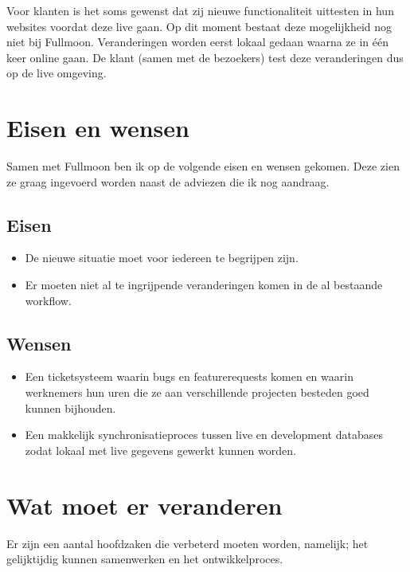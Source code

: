 \documentclass[12pt,a4paper]{article}
\begin{document}
  Voor klanten is het soms gewenst dat zij nieuwe functionaliteit uittesten in hun websites voordat deze live gaan. Op dit moment bestaat deze mogelijkheid nog niet bij Fullmoon. Veranderingen worden eerst lokaal gedaan waarna ze in \'{e}\'{e}n keer online gaan. De klant (samen met de bezoekers) test deze veranderingen dus op de live omgeving.

  \section{Eisen en wensen}
  
  Samen met Fullmoon ben ik op de volgende eisen en wensen gekomen. Deze zien ze graag ingevoerd worden naast de adviezen die ik nog aandraag.
  
    \subsection{Eisen}
    
    \begin{itemize}
      \item De nieuwe situatie moet voor iedereen te begrijpen zijn.
      \item Er moeten niet al te ingrijpende veranderingen komen in de al bestaande workflow.
    \end{itemize}
    
    \subsection{Wensen}
    
    \begin{itemize}
      \item Een ticketsysteem waarin bugs en featurerequests komen en waarin werknemers hun uren die ze aan verschillende projecten besteden goed kunnen bijhouden.
      \item Een makkelijk synchronisatieproces tussen live en development databases zodat lokaal met live gegevens gewerkt kunnen worden.
    \end{itemize}
  
  \section{Wat moet er veranderen}
  
  Er zijn een aantal hoofdzaken die verbeterd moeten worden, namelijk; het gelijktijdig kunnen samenwerken en het ontwikkelproces.
  
\end{document}
